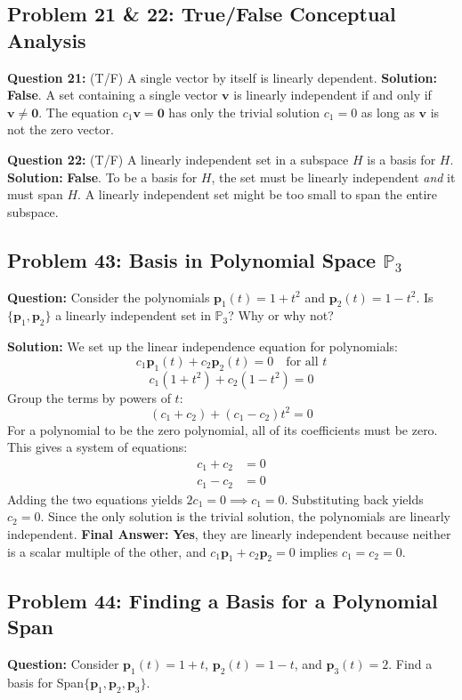 \documentclass[12pt]{article}
\begin{document}
\subsection{Problem 21 \& 22: True/False Conceptual Analysis}
\textbf{Question 21:} (T/F) A single vector by itself is linearly dependent.
\textbf{Solution:} \textbf{False}. A set containing a single vector $\mathbf{v}$ is linearly independent if and only if $\mathbf{v} \neq \mathbf{0}$. The equation $c_1\mathbf{v} = \mathbf{0}$ has only the trivial solution $c_1 = 0$ as long as $\mathbf{v}$ is not the zero vector.

\textbf{Question 22:} (T/F) A linearly independent set in a subspace $H$ is a basis for $H$.
\textbf{Solution:} \textbf{False}. To be a basis for $H$, the set must be linearly independent \textit{and} it must span $H$. A linearly independent set might be too small to span the entire subspace.

\subsection{Problem 43: Basis in Polynomial Space $\mathbb{P}_3$}
\textbf{Question:} Consider the polynomials $\mathbf{p}_1(t) = 1 + t^2$ and $\mathbf{p}_2(t) = 1 - t^2$. Is $\{\mathbf{p}_1, \mathbf{p}_2\}$ a linearly independent set in $\mathbb{P}_3$? Why or why not?

\textbf{Solution:}
We set up the linear independence equation for polynomials:
\[ c_1\mathbf{p}_1(t) + c_2\mathbf{p}_2(t) = 0 \quad \text{for all } t \]
\[ c_1(1 + t^2) + c_2(1 - t^2) = 0 \]
Group the terms by powers of $t$:
\[ (c_1 + c_2) + (c_1 - c_2)t^2 = 0 \]
For a polynomial to be the zero polynomial, all of its coefficients must be zero. This gives a system of equations:
\begin{align*}
c_1 + c_2 &= 0 \\
c_1 - c_2 &= 0
\end{align*}
Adding the two equations yields $2c_1 = 0 \implies c_1 = 0$. Substituting back yields $c_2 = 0$.
Since the only solution is the trivial solution, the polynomials are linearly independent.
\textbf{Final Answer:} \textbf{Yes}, they are linearly independent because neither is a scalar multiple of the other, and $c_1\mathbf{p}_1 + c_2\mathbf{p}_2 = 0$ implies $c_1=c_2=0$.

\subsection{Problem 44: Finding a Basis for a Polynomial Span}
\textbf{Question:} Consider $\mathbf{p}_1(t) = 1+t$, $\mathbf{p}_2(t) = 1-t$, and $\mathbf{p}_3(t) = 2$. Find a basis for Span$\{\mathbf{p}_1, \mathbf{p}_2, \mathbf{p}_3\}$.
\end{document}
